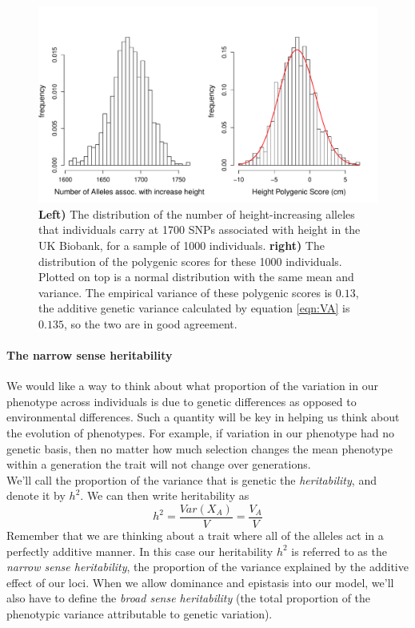 \begin{figure}
\begin{center}
\includegraphics[width=\textwidth]{figures/Biobank_height_dist.pdf}
\end{center}
\caption{{\bf Left)} The distribution of the number of
  height-increasing alleles that individuals carry at 1700 SNPs
  associated with height in the UK Biobank, for a sample of 1000
  individuals. {\bf right)} The distribution of the polygenic scores
  for these 1000 individuals. Plotted on top is a normal distribution
  with the same mean and variance. The empirical variance of these
  polygenic scores is $0.13$, the additive genetic variance calculated
  by equation \eqref{eqn:VA} is $0.135$, so the two are in good
  agreement.  } \label{fig:Biobank_height_PGS}
\end{figure}
 

\paragraph{The narrow sense heritability}
We would like a way to think about what proportion of the variation
in our phenotype across individuals is due to genetic differences as
opposed to environmental differences. Such a quantity will be key in
helping us think about the evolution of phenotypes. For example, if
variation in our phenotype had no genetic basis, then no matter how
much selection changes the mean phenotype within a generation
the trait will not change over generations. \\

We'll call the proportion of the variance that is genetic the
\textit{heritability}, and denote it by $h^2$. We can then write heritability as
\begin{equation}
h^2 = \frac{Var(X_A)}{V} = \frac{V_A}{V}
\end{equation}
Remember that we are thinking about a trait where all of the alleles act
in a perfectly additive manner. In this case our heritability $h^2$ is
referred to as the \textit{narrow sense heritability}, the proportion of the
variance explained by the additive effect of our loci.
When we allow dominance
and epistasis into our model, we'll also have to define the \textit{broad sense
heritability} (the total proportion of the phenotypic variance
attributable to genetic variation).\\

